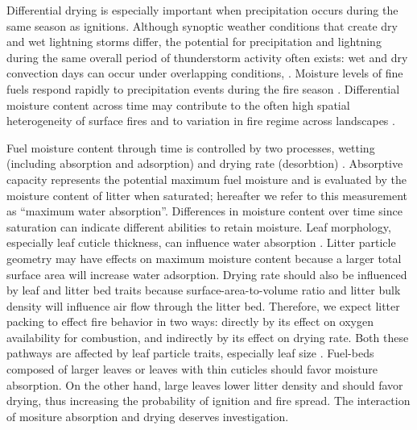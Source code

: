 \documentclass[letterpaper,12pt]{article}
\begin{document}
Differential drying is especially important when precipitation occurs
during the same season as ignitions. Although synoptic weather conditions that
create dry and wet lightning storms differ, the potential for precipitation and
lightning during the same overall period of thunderstorm activity often exists:
wet and dry convection days can occur under overlapping conditions,
\citep{Rorig+Ferguson-1999}. Moisture levels of fine fuels respond rapidly to
precipitation events during the fire season \citep{Estes+Knapp+etal-2012}.
Differential moisture content across time may contribute to the often high
spatial heterogeneity of surface fires \citep{Hille+Stephens-2005,
  Knapp+Keeley-2006, Kreye_Hiers_etal-2018} and to variation in fire regime
across landscapes \citep{Stephens-2001}.

Fuel moisture content through time is controlled by two processes, wetting
(including absorption and adsorption) and drying rate (desorbtion)
\citep{Anderson-1990, Kreye+Kobziar+etal-2013}. Absorptive capacity represents
the potential maximum fuel moisture and is evaluated by the moisture content of
litter when saturated; hereafter we refer to this measurement as ``maximum
water absorption''. Differences in moisture content over time since saturation
can indicate different abilities to retain moisture. Leaf morphology,
especially leaf cuticle thickness, can influence water absorption
\citep{Van_Wagner-1969}. Litter particle geometry may have effects on maximum
moisture content because a larger total surface area will increase water
adsorption. Drying rate should also be influenced by leaf and litter bed traits
because surface-area-to-volume ratio and litter bulk density will influence air
flow through the litter bed. Therefore, we expect litter packing to effect fire
behavior in two ways: directly by its effect on oxygen availability for
combustion, and indirectly by its effect on drying rate. Both these pathways
are affected by leaf particle traits, especially leaf size
\citep{Scarff+Westoby-2006}. Fuel-beds composed of larger leaves or leaves with
thin cuticles should favor moisture absorption. On the other hand, large leaves
lower litter density and should favor drying, thus increasing the probability
of ignition and fire spread. The interaction of mositure absorption and drying
deserves investigation.
\end{document}
